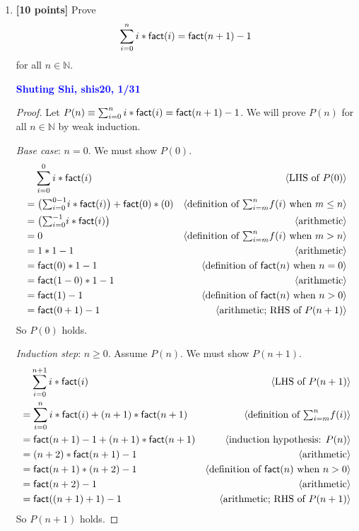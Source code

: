 \documentclass[11pt,fleqn]{article}
\newcommand{\mname}[1]{\mbox{\sf #1}}
\newcommand{\pnote}[1]{{\langle \text{#1} \rangle}}
\begin{document}
\begin{enumerate}

  \item \textbf{[10 points]} Prove \[\sum^{n}_{i = 0} i *
    \mname{fact}(i) = \mname{fact}(n+1) - 1\] for all $n \in
    \mathbb{N}$.

  

  \textcolor{blue}{\textbf{Shuting Shi, shis20, 1/31}}

\begin{proof}
Let $P(n) \equiv \sum^{n}_{i=0}i*\mname{fact}(i) =\mname{fact}(n+1)-1$.  We will prove $P(n)$
for all $n \in \mathbb{N}$ by weak induction.

\medskip

\emph{Base case}: $n = 0$.  We must show $P(0)$.
\begin{align*}
  &\phantom{{}=} \sum_{i=0}^{0}i*\mname{fact}(i) & \pnote{LHS of $P(0)$}\\
  &= \big(\textstyle{\sum}_{i=0}^{0-1} i*\mname{fact}(i)\big)+ \mname{fact}(0)*(0) & \pnote{definition of $\textstyle{\sum}_{i=m}^{n} f(i)$ when $m \le n$}\\
  &= \big(\textstyle{\sum}_{i=0}^{-1} i*\mname{fact}(i)\big)         & \pnote{arithmetic}\\
  &= 0      & \pnote{definition of $\textstyle{\sum}_{i=m}^{n} f(i)$ when $m > n$}\\
  &=1*1-1 	& \pnote{arithmetic}\\
  &=\mname{fact}(0)*1-1	& \pnote{definition of $\mname{fact}(n)$ when $n = 0$}\\
  &=\mname{fact}(1-0)*1-1	& \pnote{arithmetic}\\
  &=\mname{fact}(1)-1	& \pnote{definition of $\mname{fact}(n)$ when $n > 0$}\\
  &=\mname{fact}(0+1)-1	& \pnote{arithmetic; RHS of $P(n + 1)$}
\end{align*}
So $P(0)$ holds.

\medskip

\emph{Induction step}: $n \ge 0$. Assume $P(n)$. We must show $P(n + 1)$.
\begin{align*}
  &\phantom{{}=} \sum_{i=0}^{n + 1} i*\mname{fact}(i)   & \pnote{LHS of $P(n + 1)$}\\
  &=  \sum_{i=0}^{n} i*\mname{fact}(i)  + (n+1)*\mname{fact}(n+1)     & \pnote{definition of $\textstyle{\sum}_{i=m}^{n} f(i)$}\\
  &= \mname{fact}(n+1) - 1 + (n+1)*\mname{fact}(n+1) & \pnote{induction hypothesis: $P(n)$}\\
  &= (n+2)*\mname{fact}(n+1) - 1          & \pnote{arithmetic}\\
  &= \mname{fact}(n+1)  * (n+2) -1               & \pnote{definition of $\mname{fact}(n)$ when $n > 0$}\\
  &=  \mname{fact}(n+2) - 1	& \pnote{arithmetic}\\
  &=  \mname{fact}((n+1)+1) - 1            & \pnote{arithmetic; RHS of $P(n + 1)$}
\end{align*}
So $P(n + 1)$ holds.


\end{proof}
\end{enumerate}
\end{document}
